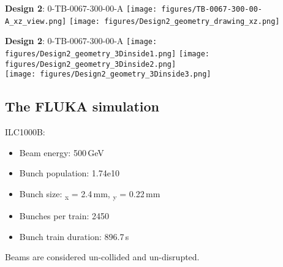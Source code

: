 \documentclass[xcolor={dvipsnames}]{beamer}
\begin{document}
\begin{frame}{\textbf{Design 2}: 0-TB-0067-300-00-A}
\centering
  \texttt{[image: figures/TB-0067-300-00-A\_xz\_view.png]}
  \hfill
  \texttt{[image: figures/Design2\_geometry\_drawing\_xz.png]}
\end{frame}
\begin{frame}{\textbf{Design 2}: 0-TB-0067-300-00-A}
\centering
  \texttt{[image: figures/Design2\_geometry\_3Dinside1.png]}
    \texttt{[image: figures/Design2\_geometry\_3Dinside2.png]}\\
      \texttt{[image: figures/Design2\_geometry\_3Dinside3.png]}
\end{frame}



\subsection{The FLUKA simulation}
\begin{frame}
 ILC1000B:
 \begin{itemize}
  \item Beam energy: 500\,GeV
  \item Bunch population: 1.74e10
  \item Bunch size: \textsigma\textsubscript{x} = 2.4\,mm, \textsigma\textsubscript{y} = 0.22\,mm
  \item Bunches per train: 2450
  \item Bunch train duration: 896.7\,\textmu s
 \end{itemize}

Beams are considered un-collided and un-disrupted.
\end{frame}
\end{document}

